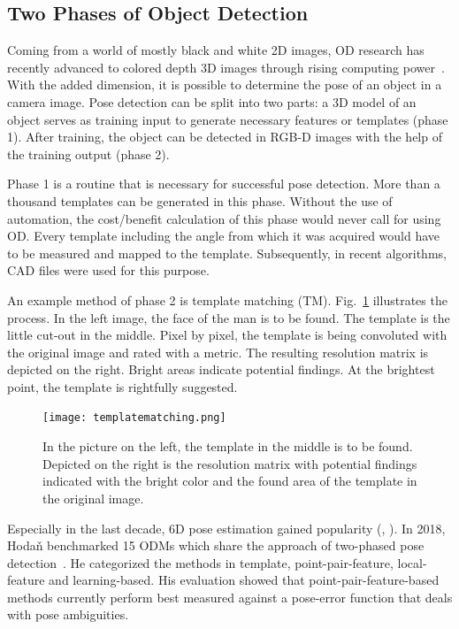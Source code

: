 \subsection{Two Phases of Object Detection}
Coming from a world of mostly black and white 2D images, OD research has recently advanced to colored depth 3D images through rising computing power~\cite{Hornberg2017HandbookVision}. With the added dimension, it is possible to determine the pose of an object in a camera image. Pose detection can be split into two parts: a 3D model of an object serves as training input to generate necessary features or templates (phase 1).  After training, the object can be detected in RGB-D images with the help of the training output (phase 2). 

Phase 1 is a routine that is necessary for successful pose detection. More than a thousand templates can be generated in this phase. Without the use of automation, the cost/benefit calculation of this phase would never call for using OD. Every template including the angle from which it was acquired would have to be measured and mapped to the template. Subsequently, in recent algorithms, CAD files were used for this purpose. 

An example method of phase 2 is template matching (TM). Fig.~\ref{templatematching} illustrates the process. In the left image, the face of the man is to be found. The template is the little cut-out in the middle. Pixel by pixel, the template is being convoluted with the original image and rated with a metric. The resulting resolution matrix is depicted on the right. Bright areas indicate potential findings. At the brightest point, the template is rightfully suggested.~\cite{OpenCV-Documentation2018Template2018}

\begin{figure}[ht]
	\centering
  \texttt{[image: templatematching.png]}
	\caption[Template Matching]{In the picture on the left, the template in the middle is to be found. Depicted on the right is the resolution matrix with potential findings indicated with the bright color and the found area of the template in the original image.~\cite{OpenCV-Documentation2018Template2018}}
	\label{templatematching}
\end{figure}

Especially in the last decade, 6D pose estimation gained popularity (\cite{Drost2010ModelRecognition}, \cite{Sundermeyer2018ImplicitImages} \cite{Hinterstoisser2013ModelScenes}). In 2018, Hodaň benchmarked 15 ODMs which share the approach of two-phased pose detection~\cite{Hodan2018BOP:Estimation}. He categorized the methods in template, point-pair-feature, local-feature and learning-based. His evaluation showed that point-pair-feature-based methods currently perform best measured against a pose-error function that deals with pose ambiguities.

